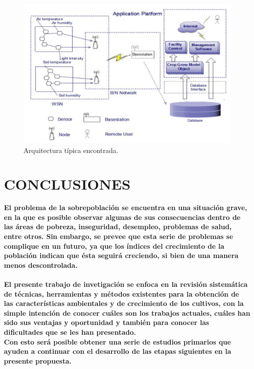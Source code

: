 \documentclass[10pt, twocolumn]{article}
\begin{document}
\begin{figure}[!ht]
	\centering
	\includegraphics[scale=0.5]{common_architecture.png}
	\caption{Arquitectura típica encontrada.}
\end{figure}

\section{CONCLUSIONES}
\paragraph{El problema de la sobrepoblación se encuentra en una situación grave, en la que es posible observar algunas de sus consecuencias dentro de las áreas de pobreza, inseguridad, desempleo, problemas de salud, entre otros. Sin embargo, se prevee que esta serie de problemas se complique en un futuro, ya que los índices del crecimiento de la población indican que ésta seguirá creciendo, si bien de una manera menos descontrolada.}
\paragraph{El presente trabajo de invetigación se enfoca en la revisión sistemática de técnicas, herramientas y métodos existentes para la obtención de las características ambientales y de crecimiento de los cultivos, con la simple intención de conocer cuáles son los trabajos actuales, cuáles han sido sus ventajas y oportunidad y también para conocer las dificultades que se les han presentado. \\ Con esto será posible obtener una serie de estudios primarios que ayuden a continuar con el desarrollo de las etapas siguientes en la presente propuesta.}
\end{document}
